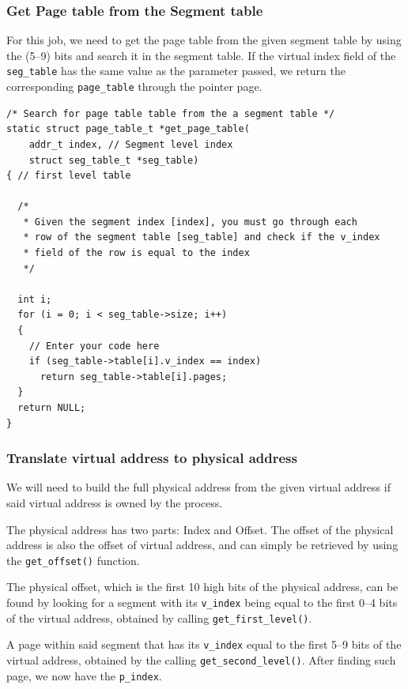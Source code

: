 \documentclass[a4paper]{article}
\numberwithin{equation}{section}
\begin{document}
\subsubsection{Get Page table from the Segment table}
For this job, we need to get the page table from the given segment table by using the (5--9) bits and search it in the segment table.
If the virtual index field of the \texttt{seg_table} has the same value as the parameter passed, we return the corresponding \texttt{page_table} through the pointer page.
\begin{mdframed}[leftline=false,rightline=false,backgroundcolor=magenta!10,nobreak=false]
  \begin{verbatim}
/* Search for page table table from the a segment table */
static struct page_table_t *get_page_table(
    addr_t index, // Segment level index
    struct seg_table_t *seg_table)
{ // first level table

  /*
   * Given the segment index [index], you must go through each
   * row of the segment table [seg_table] and check if the v_index
   * field of the row is equal to the index
   */

  int i;
  for (i = 0; i < seg_table->size; i++)
  {
    // Enter your code here
    if (seg_table->table[i].v_index == index)
      return seg_table->table[i].pages;
  }
  return NULL;
}
  \end{verbatim}
\end{mdframed}

\subsubsection{Translate virtual address to physical address}
We will need to build the full physical address from the given virtual address if said virtual address is owned by the process.

The physical address has two parts: Index and Offset.
The offset of the physical address is also the offset of virtual address, and can simply be retrieved by using the \texttt{get_offset()} function.

The physical offset, which is the first 10 high bits of the physical address, can be found by looking for a segment with its \texttt{v_index} being equal to the first 0--4 bits of the virtual address, obtained by calling \texttt{get_first_level()}.

A page within said segment that has its \texttt{v_index} equal to the first 5--9 bits of the virtual address, obtained by the calling \texttt{get_second_level()}.
After finding such page, we now have the \texttt{p_index}.
\end{document}
